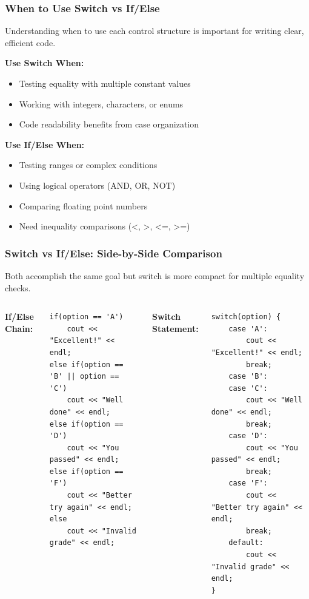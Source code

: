 \documentclass{beamer}
\begin{document}
\begin{frame}
\frametitle{When to Use Switch vs If/Else}
Understanding when to use each control structure is important for writing clear, efficient code.

\textbf{Use Switch When:}
\begin{itemize}
\item Testing equality with multiple constant values
\pause
\item Working with integers, characters, or enums
\pause
\item Code readability benefits from case organization
\end{itemize}

\textbf{Use If/Else When:}
\begin{itemize}
\item Testing ranges or complex conditions
\pause
\item Using logical operators (AND, OR, NOT)
\pause
\item Comparing floating point numbers
\pause
\item Need inequality comparisons (<, >, <=, >=)
\end{itemize}
\end{frame}

\begin{frame}[fragile]
\frametitle{Switch vs If/Else: Side-by-Side Comparison}
Both accomplish the same goal but switch is more compact for multiple equality checks.

\begin{columns}[t]
\textbf{If/Else Chain:}
\begin{verbatim}
if(option == 'A')
    cout << "Excellent!" << endl;
else if(option == 'B' || option == 'C')
    cout << "Well done" << endl;
else if(option == 'D')
    cout << "You passed" << endl;
else if(option == 'F')
    cout << "Better try again" << endl;
else
    cout << "Invalid grade" << endl;
\end{verbatim}

\textbf{Switch Statement:}
\begin{verbatim}
switch(option) {
    case 'A':
        cout << "Excellent!" << endl;
        break;
    case 'B':
    case 'C':
        cout << "Well done" << endl;
        break;
    case 'D':
        cout << "You passed" << endl;
        break;
    case 'F':
        cout << "Better try again" << endl;
        break;
    default:
        cout << "Invalid grade" << endl;
}
\end{verbatim}
\end{columns}
\end{frame}
\end{document}
